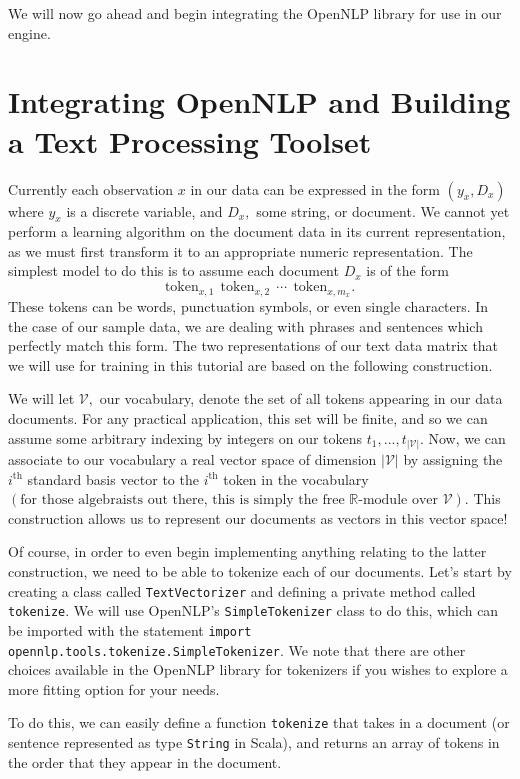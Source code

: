 \documentclass[a4paper,12pt]{article}
\newcommand{\field}[1]{\mathbb{#1}}
\newcommand{\R}{\field{R}}
\renewcommand{\tt}[1]{\texttt{#1}}
\newcommand{\3}{\left}
\newcommand{\4}{\right}
\renewcommand{\-}[1]{{}^{-#1}}
\begin{document}
We will now go ahead and begin integrating the OpenNLP library for use in our engine. 

\break

\section*{Integrating OpenNLP and Building a Text Processing Toolset}

Currently each observation $x$ in our data can be expressed in the form $(y_x, D_x)$ where $y_x$ is a discrete variable, and $D_x,$ some string, or document. We cannot yet perform a learning algorithm on the document data in its current representation, as we must first transform it to an appropriate numeric representation. The simplest model to do this is to assume each document $D_x$ is of the form
$$
\text{token}_{x, 1} \ \ \text{token}_{x, 2} \ \ \cdots \ \ \text{token}_{x, m_x}.
$$
These tokens can be words, punctuation symbols, or even single characters. In the case of our sample data, we are dealing with phrases and sentences which perfectly match this form. The two representations of our text data matrix that we will use for training in this tutorial are based on the following construction.

We will let $\mathcal{V},$ our vocabulary, denote the set of all tokens appearing in our data documents. For any practical application, this set will be finite, and so we can assume some arbitrary indexing by integers on our tokens $t_1, ..., t_{|\mathcal{V}|}.$ Now, we can associate to our vocabulary a real vector space of dimension $|\mathcal{V}|$ by assigning the $i^\text{th}$ standard basis vector to the $i^\text{th}$ token in the vocabulary $\3(\text{for those algebraists out there, this is simply the free $\R$-module over $\mathcal{V}$}\4).$ This construction allows us to represent our documents as vectors in this vector space! 

Of course, in order to even begin implementing anything relating to the latter construction, we need to be able to tokenize each of our documents. Let's start by creating a class called \tt{TextVectorizer} and defining a private method called \tt{tokenize}. We will use OpenNLP's \tt{SimpleTokenizer} class to do this, which can be imported with the statement \tt{import opennlp.tools.tokenize.SimpleTokenizer}. We note that there are other choices available in the OpenNLP library for tokenizers if you wishes to explore a more fitting option for your needs.


To do this, we can easily define a function \tt{tokenize} that takes in a document (or sentence represented as type \tt{String} in Scala), and returns an array of tokens in the order that they appear in the document. 
\end{document}
